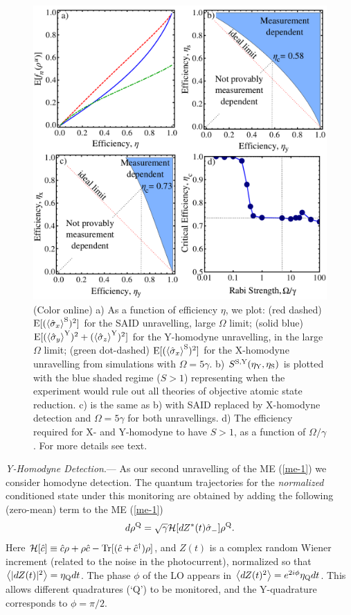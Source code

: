 \documentclass[12pt,prl,floatfix,showpacs,superscriptaddress,amsmath,amssymb]{revtex4}
\newcommand{\beq}{\begin{equation}}
\newcommand{\eeq}{\end{equation}}
\newcommand{\dg}{^\dagger}
\renewcommand{\(}{\left(}
\renewcommand{\)}{\right)}
\newcommand{\an}[1]{\left\langle{#1}\right\rangle}
\renewcommand{\d}{^{\rm Y}}
\newcommand{\p}{^{\rm S}}
\newcommand{\q}{^{\rm Q}}
\newcommand{\s}[1]{\hat \sigma_{#1}}
\renewcommand{\section}[1]{{\em #1}.---}
\begin{document}
\begin{figure}\begin{center}
\includegraphics[width=0.85\linewidth]{Figure1}\end{center}
\vspace{-3ex} \caption{(Color online) a) As a function of efficiency $\eta$, we plot: (red dashed) ${\rm E}[(\an{\s{x}}\p)^2]$ for the SAID unravelling, large $\Omega$ limit;  (solid blue) ${\rm E}[(\an{\s{y}}\d)^2 + (\an{\s{z}}\d)^2]$ for the Y-homodyne unravelling, in the large $\Omega$ limit; (green dot-dashed) ${\rm E}[(\an{\s{x}}\p)^2]$ for the X-homodyne unravelling from simulations with $\Omega=5\gamma$. b) $S^{\rm S,Y}(\eta_{\rm Y},\eta_{\rm S})$  is plotted with the blue shaded regime ($S>1$) representing when the experiment would rule out all theories of objective atomic state reduction. c) is the same as b) with  SAID replaced by X-homodyne detection and $\Omega=5\gamma$ for both unravellings. d) The efficiency required for X- and Y-homodyne to have $S>1$, as a function of $\Omega/\gamma$. 
For more details see text.}
\label{fig:Measurements}\label{fig:saidhomoy}\end{figure}

\section{Y-Homodyne Detection} As our second unravelling of the ME (\ref{me-1}) we consider homodyne detection. 
The quantum trajectories for the {\em normalized} conditioned state under this monitoring are obtained by adding the following 
 (zero-mean)  term to the ME (\ref{me-1}) \cite{WisMil10} 
\beq \label{dyne}
d\rho\q = \sqrt{\gamma}{\cal H}[ dZ^*(t) \s{-}]\rho\q .
\eeq 
Here ${\cal H}[\hat c] \equiv \hat c\rho + \rho \hat c - {\rm Tr}[(\hat c+ \hat c\dg)\rho]$, and 
$Z(t)$ is a complex random Wiener increment (related to the noise in the photocurrent), normalized so that $\an{ |dZ(t)|^2}= \eta_{\rm Q}dt$. The phase $\phi$ of the LO appears in $\an{dZ(t)^2} = e^{2i\phi} \eta_{\rm Q} dt$. This allows different quadratures (`Q') to be monitored, and the Y-quadrature corresponds to $\phi = \pi/2$.  
\end{document}
